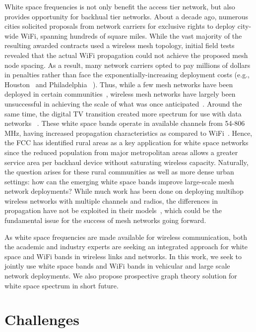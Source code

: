 White space frequencies is not only benefit the access tier network, 
but also provides opportunity for backhual tier networks. About a 
decade ago, numerous cities solicited proposals from network carriers 
for exclusive rights to deploy city-wide WiFi, spanning hundreds of 
square miles. While the vast majority of the resulting awarded 
contracts used a wireless mesh topology, initial field tests revealed 
that the actual WiFi propagation could not achieve the proposed mesh node
spacing. As a result, many network carriers opted to pay millions of 
dollars in penalties rather than face the exponentially-increasing
deployment costs (e.g., Houston~\cite{cnet_aug07} and Philadelphia
~\cite{arstechnica_may08}). Thus, while a few mesh networks have been 
deployed in certain communities~\cite{CRSK06,google_imc08}, wireless 
mesh networks have largely been unsuccessful in achieving the scale 
of what was once anticipated~\cite{taps}. Around the same time, the 
digital TV transition created more spectrum for use with data networks
~\cite{fccwhitespace}. These white space bands operate in available 
channels from 54-806 MHz, having increased propagation characteristics 
as compared to WiFi~\cite{balanis2012antenna}. Hence, the FCC has 
identified rural areas as a key application for white space networks 
since the reduced population from major metropolitan areas allows a 
greater service area per backhaul device without saturating wireless 
capacity. Naturally, the question arises for these rural communities 
as well as more dense urban settings: how can the emerging white space 
bands improve large-scale mesh network deployments?  While much work 
has been done on deploying multihop wireless networks with multiple 
channels and radios, the differences in propagation have not be 
exploited in their models~\cite{raniwala2004centralized,tang2005interference, si2010overview}, 
which could be the fundamental issue for the success of mesh networks 
going forward.

As white space frequencies are made available for wireless communication,
both the academic and  industry experts are seeking an integrated approach
for white space and WiFi bands in wireless links and networks. 
In this work, we seek to jointly use 
white space bands and WiFi bands in vehicular and large scale network deployments. 
We also
propose prospective graph theory solution for white space spectrum 
in short future. 


\section{Challenges}

